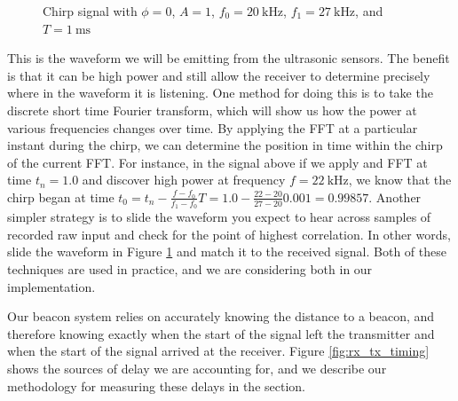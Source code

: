 \documentclass{article}
\begin{document}
      \begin{figure}[H]
        \centering
        \caption{Chirp signal with $\phi=0$, $A=1$, $f_0=\SI{20}{\kilo\hertz}$, $f_1=\SI{27}{\kilo\hertz}$, and $T=\SI{1}{\milli\second}$}
        \label{fig:chirp}
      \end{figure}

        This is the waveform we will be emitting from the ultrasonic sensors. The benefit is that it can be high power and still allow the receiver to determine precisely where in the waveform it is listening. One method for doing this is to take the discrete short time Fourier transform, which will show us how the power at various frequencies changes over time. By applying the FFT at a particular instant during the chirp, we can determine the position in time within the chirp of the current FFT. For instance, in the signal above if we apply and FFT at time $t_n=1.0$ and discover high power at frequency $f=\SI{22}{\kilo\hertz}$, we know that the chirp began at time $t_0 = t_n - \tfrac{f - f_0}{f_1 - f_0}T = 1.0 - \tfrac{22-20}{27-20}0.001 = 0.99857$. Another simpler strategy is to slide the waveform you expect to hear across samples of recorded raw input and check for the point of highest correlation. In other words, slide the waveform in Figure \ref{fig:chirp} and match it to the received signal. Both of these techniques are used in practice, and we are considering both in our implementation.

        Our beacon system relies on accurately knowing the distance to a beacon, and therefore knowing exactly when the start of the signal left the transmitter and when the start of the signal arrived at the receiver. Figure \ref{fig:rx_tx_timing} shows the sources of delay we are accounting for, and we describe our methodology for measuring these delays in the  section. \\
\end{document}
